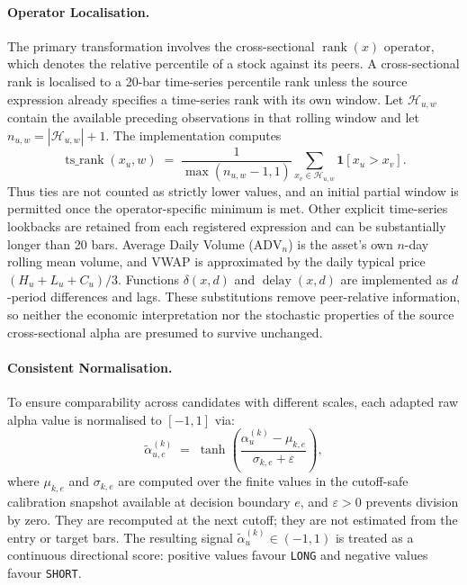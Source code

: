 \paragraph{Operator Localisation.}
The primary transformation involves the cross-sectional $\operatorname{rank}(x)$ operator, which denotes the relative percentile of a stock against its peers. A cross-sectional rank is localised to a 20-bar time-series percentile rank unless the source expression already specifies a time-series rank with its own window. Let $\mathcal{H}_{u,w}$ contain the available preceding observations in that rolling window and let $n_{u,w}=|\mathcal{H}_{u,w}|+1$. The implementation computes
\begin{equation}
    \operatorname{ts\_rank}(x_u,w)
    \;=\;
    \frac{1}{\max(n_{u,w}-1,1)}
    \sum_{x_v\in\mathcal{H}_{u,w}} \mathbf{1}[x_u>x_v].
    \label{eq:ts_rank_localised}
\end{equation}
Thus ties are not counted as strictly lower values, and an initial partial window is permitted once the operator-specific minimum is met. Other explicit time-series lookbacks are retained from each registered expression and can be substantially longer than 20 bars. Average Daily Volume ($\mathrm{ADV}_{n}$) is the asset's own $n$-day rolling mean volume, and VWAP is approximated by the daily typical price $(H_u+L_u+C_u)/3$. Functions $\delta(x,d)$ and $\operatorname{delay}(x,d)$ are implemented as $d$-period differences and lags. These substitutions remove peer-relative information, so neither the economic interpretation nor the stochastic properties of the source cross-sectional alpha are presumed to survive unchanged.

\paragraph{Consistent Normalisation.}
To ensure comparability across candidates with different scales, each adapted raw alpha value is normalised to $[-1,1]$ via:
\begin{equation}
    \tilde{\alpha}^{(k)}_{u,e}
    \;=\;
    \tanh\!\left(
        \frac{\alpha^{(k)}_u - \mu_{k,e}}{\sigma_{k,e} + \varepsilon}
    \right),
    \label{eq:alpha_norm}
\end{equation}
where $\mu_{k,e}$ and $\sigma_{k,e}$ are computed over the finite values in
the cutoff-safe calibration snapshot available at decision boundary $e$, and
$\varepsilon > 0$ prevents division by zero. They are recomputed at the next
cutoff; they are not estimated from the entry or target bars.
The resulting signal $\tilde{\alpha}^{(k)}_u \in (-1, 1)$ is treated as
a continuous directional score: positive values favour \texttt{LONG} and
negative values favour \texttt{SHORT}.

